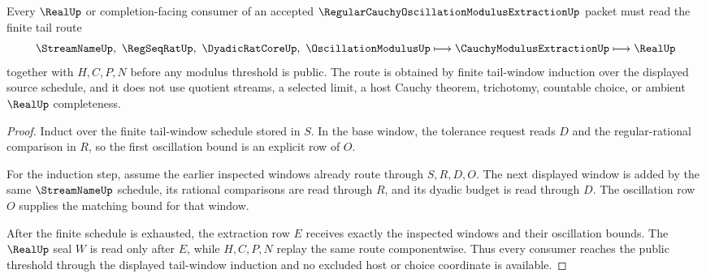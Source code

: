 \begin{theorem}
\label{thm:regular-cauchy-oscillation-modulus-extraction-tail-route}
Every $\RealUp$ or completion-facing consumer of an accepted $\RegularCauchyOscillationModulusExtractionUp$ packet must read the finite tail route
$$
\StreamNameUp,\ \RegSeqRatUp,\ \DyadicRatCoreUp,\ \OscillationModulusUp
\longmapsto
\CauchyModulusExtractionUp
\longmapsto
\RealUp
$$
together with $H,C,P,N$ before any modulus threshold is public. The route is obtained by finite tail-window induction over the displayed source schedule, and it does not use quotient streams, a selected limit, a host Cauchy theorem, trichotomy, countable choice, or ambient $\RealUp$ completeness.
\end{theorem}
\begin{proof}
Induct over the finite tail-window schedule stored in $S$. In the base window, the tolerance request reads $D$ and the regular-rational comparison in $R$, so the first oscillation bound is an explicit row of $O$.

For the induction step, assume the earlier inspected windows already route through $S,R,D,O$. The next displayed window is added by the same $\StreamNameUp$ schedule, its rational comparisons are read through $R$, and its dyadic budget is read through $D$. The oscillation row $O$ supplies the matching bound for that window.

After the finite schedule is exhausted, the extraction row $E$ receives exactly the inspected windows and their oscillation bounds. The $\RealUp$ seal $W$ is read only after $E$, while $H,C,P,N$ replay the same route componentwise. Thus every consumer reaches the public threshold through the displayed tail-window induction and no excluded host or choice coordinate is available.
\end{proof}



